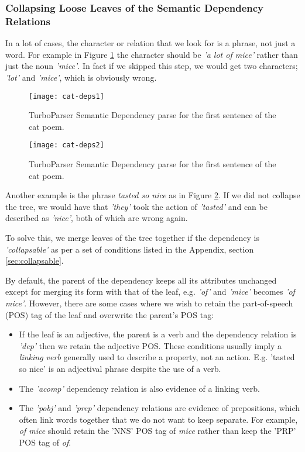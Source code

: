 \subsubsection{Collapsing Loose Leaves of the Semantic Dependency Relations}
\label{sec:collapse}

In a lot of cases, the character or relation that we look for is a phrase, not just a word. For example in Figure \ref{fig:cat-deps1} the character should be \textit{'a lot of mice'} rather than just the noun \textit{'mice'}. In fact if we skipped this step, we would get two characters; \textit{'lot'} and \textit{'mice'}, which is obviously wrong.

\begin{figure}[h!]
\centering
\texttt{[image: cat-deps1]}
\caption{TurboParser Semantic Dependency parse for the first sentence of the cat poem.}
\label{fig:cat-deps1}
\end{figure}

\begin{figure}[h!]
\centering
\texttt{[image: cat-deps2]}
\caption{TurboParser Semantic Dependency parse for the first sentence of the cat poem.}
\label{fig:cat-deps2}
\end{figure}

Another example is the phrase \textit{tasted so nice} as in Figure \ref{fig:cat-deps2}. If we did not collapse the tree, we would have that \textit{'they'} took the action of \textit{'tasted'} and can be described as \textit{'nice'}, both of which are wrong again.

To solve this, we merge leaves of the tree together if the dependency is \textit{'collapsable'} as per a set of conditions listed in the Appendix, section \ref{sec:collapsable}.

By default, the parent of the dependency keeps all its attributes unchanged except for merging its form with that of the leaf, e.g. \textit{'of'} and \textit{'mice'} becomes \textit{'of mice'}. However, there are some cases where we wish to retain the part-of-speech (POS) tag of the leaf and overwrite the parent's POS tag:

\begin{itemize}
\item{If the leaf is an adjective, the parent is a verb and the dependency relation is \textit{'dep'} then we retain the adjective POS. These conditions usually imply a \textit{linking verb} generally used to describe a property, not an action. E.g. 'tasted so nice' is an adjectival phrase despite the use of a verb.}
\item{The \textit{'acomp'} dependency relation is also evidence of a linking verb.}
\item{The \textit{'pobj'} and \textit{'prep'} dependency relations are evidence of prepositions, which often link words together that we do not want to keep separate. For example, \textit{of mice} should retain the 'NNS' POS tag of \textit{mice} rather than keep the 'PRP' POS tag of \textit{of}. }
\end{itemize}


